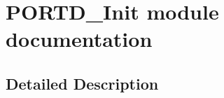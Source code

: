\hypertarget{group___p_o_r_t_d___init__module}{}\section{P\+O\+R\+T\+D\+\_\+\+Init module documentation}
\label{group___p_o_r_t_d___init__module}


\subsection{Detailed Description}
